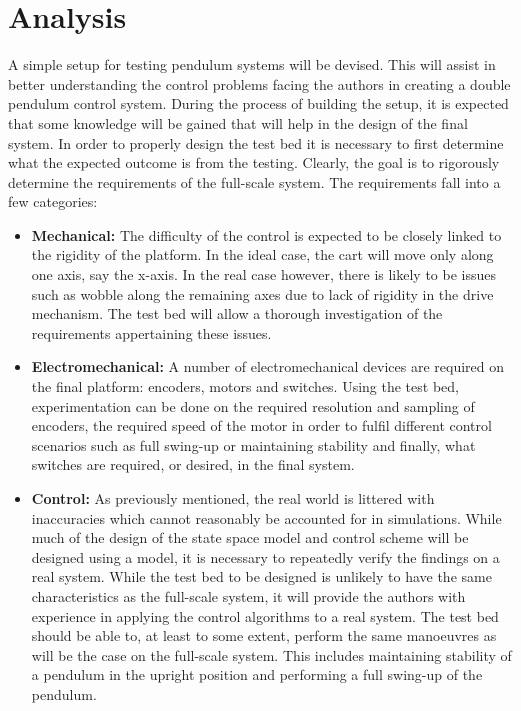 
\section{Analysis}
A simple setup for testing pendulum systems will be devised.
This will assist in better understanding the control problems facing the authors in creating a double pendulum control system.
During the process of building the setup, it is expected that some knowledge will be gained that will help in the design of the final system.
In order to properly design the test bed it is necessary to first determine what the expected outcome is from the testing.
Clearly, the goal is to rigorously determine the requirements of the full-scale system.
The requirements fall into a few categories:

\begin{itemize}
	\item \textbf{Mechanical:} The difficulty of the control is expected to be closely linked to the rigidity of the platform.
	In the ideal case, the cart will move only along one axis, say the x-axis.
	In the real case however, there is likely to be issues such as wobble along the remaining axes due to lack of rigidity in the drive mechanism.
	The test bed will allow a thorough investigation of the requirements appertaining these issues.
	\item \textbf{Electromechanical:} A number of electromechanical devices are required on the final platform: encoders, motors and switches.
	Using the test bed, experimentation can be done on the required resolution and sampling of encoders, the required speed of the motor in order to fulfil different control scenarios such as full swing-up or maintaining stability and finally, what switches are required, or desired, in the final system.
	\item \textbf{Control:} As previously mentioned, the real world is littered with inaccuracies which cannot reasonably be accounted for in simulations.
	While much of the design of the state space model and control scheme will be designed using a model, it is necessary to repeatedly verify the findings on a real system.
	While the test bed to be designed is unlikely to have the same characteristics as the full-scale system, it will provide the authors with experience in applying the control algorithms to a real system.
	The test bed should be able to, at least to some extent, perform the same manoeuvres as will be the case on the full-scale system.
	This includes maintaining stability of a pendulum in the upright position and performing a full swing-up of the pendulum.
\end{itemize}

